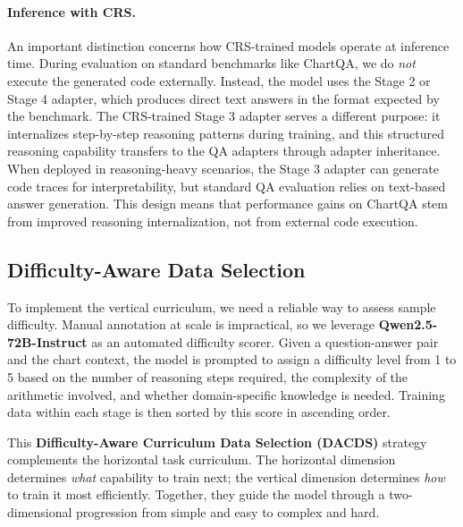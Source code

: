 ﻿\documentclass[journal]{IEEEtran}
\newcommand{\crs}{CRS}
\newcommand{\dacds}{DACDS}
\begin{document}
\paragraph{Inference with \crs{}.}
An important distinction concerns how \crs{}-trained models operate at inference time. During evaluation on standard benchmarks like ChartQA, we do \emph{not} execute the generated code externally. Instead, the model uses the Stage 2 or Stage 4 adapter, which produces direct text answers in the format expected by the benchmark. The \crs{}-trained Stage 3 adapter serves a different purpose: it internalizes step-by-step reasoning patterns during training, and this structured reasoning capability transfers to the QA adapters through adapter inheritance. When deployed in reasoning-heavy scenarios, the Stage 3 adapter can generate code traces for interpretability, but standard QA evaluation relies on text-based answer generation. This design means that performance gains on ChartQA stem from improved reasoning internalization, not from external code execution.

\subsection{Difficulty-Aware Data Selection}
\label{sec:dacds}
To implement the vertical curriculum, we need a reliable way to assess sample difficulty. Manual annotation at scale is impractical, so we leverage \textbf{Qwen2.5-72B-Instruct} as an automated difficulty scorer. Given a question-answer pair and the chart context, the model is prompted to assign a difficulty level from 1 to 5 based on the number of reasoning steps required, the complexity of the arithmetic involved, and whether domain-specific knowledge is needed. Training data within each stage is then sorted by this score in ascending order.

This \textbf{Difficulty-Aware Curriculum Data Selection (\dacds{})} strategy complements the horizontal task curriculum. The horizontal dimension determines \textit{what} capability to train next; the vertical dimension determines \textit{how} to train it most efficiently. Together, they guide the model through a two-dimensional progression from simple and easy to complex and hard.
\end{document}
